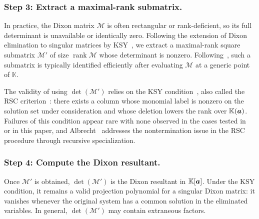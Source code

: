 \subsubsection{Step 3: Extract a maximal-rank submatrix.}\label{dixon_step3}
In practice, the Dixon matrix $\mathcal{M}$ is often rectangular or rank-deficient, so its full determinant is unavailable or identically zero. Following the extension of Dixon elimination to singular matrices by KSY~\cite{DBLP:conf/issac/KapurSY94}, we extract a maximal-rank square submatrix $\mathcal{M}'$ of size $\operatorname{rank}\mathcal{M}$ whose determinant is nonzero. Following~\cite{DBLP:conf/casc/JinaduM22,JinaduMonagan2025}, such a submatrix is typically identified efficiently after evaluating $\mathcal{M}$ at a generic point of $\mathbb{K}$.

\begin{remark}
The validity of using $\det(\mathcal M')$ relies on the
KSY condition~\cite{DBLP:conf/issac/KapurSY94}, also called the RSC criterion~\cite{Albrecht2008}: there exists a column whose monomial label is nonzero on the solution set under consideration and whose deletion
lowers the rank over $\mathbb K({\boldsymbol{a}})$. Failures of this condition appear rare with none observed in the cases tested in~\cite{DBLP:conf/issac/KapurSY94} or in this paper, and Albrecht~\cite[Section~4.2.3]{Albrecht2008} addresses the nontermination issue in the RSC procedure through recursive specialization.
\end{remark}

\subsubsection{Step 4: Compute the Dixon resultant.}\label{dixon_step4}
Once $\mathcal{M}'$ is obtained, $\det(\mathcal{M}')$ is the Dixon resultant in $\mathbb{K}[{\boldsymbol{a}}]$.
Under the KSY condition, it remains a valid projection polynomial for a singular Dixon matrix: it vanishes whenever the original system has a common solution in the eliminated variables. In general, $\det(\mathcal{M}')$ may contain extraneous factors.


